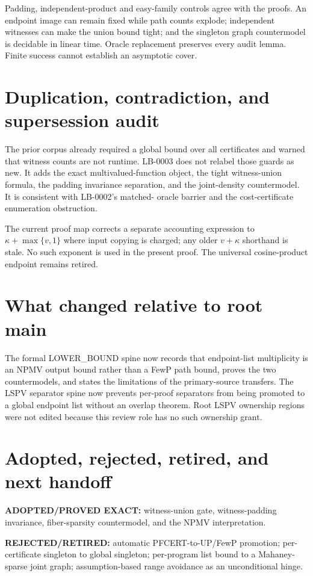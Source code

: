 \documentclass[11pt]{article}
\begin{document}
Padding, independent-product and easy-family controls agree with the
proofs.  An endpoint image can remain fixed while path counts explode;
independent witnesses can make the union bound tight; and the singleton
graph countermodel is decidable in linear time.  Oracle replacement
preserves every audit lemma.  Finite success cannot establish an
asymptotic cover.

\section{Duplication, contradiction, and supersession audit}
The prior corpus already required a global bound over all certificates
and warned that witness counts are not runtime.  LB-0003 does not relabel
those guards as new.  It adds the exact multivalued-function object, the
tight witness-union formula, the padding invariance separation, and the
joint-density countermodel.  It is consistent with LB-0002's matched-
oracle barrier and the cost-certificate enumeration obstruction.

The current proof map corrects a separate accounting expression to
$\kappa+\max\{v,1\}$ where input copying is charged; any older
$v+\kappa$ shorthand is stale.  No such exponent is used in the present
proof.  The universal cosine-product endpoint remains retired.

\section{What changed relative to root main}
The formal LOWER\_BOUND spine now records that endpoint-list multiplicity
is an NPMV output bound rather than a FewP path bound, proves the two
countermodels, and states the limitations of the primary-source
transfers.  The LSPV separator spine now prevents per-proof separators
from being promoted to a global endpoint list without an overlap theorem.
Root LSPV ownership regions were not edited because this review role has
no such ownership grant.

\section{Adopted, rejected, retired, and next handoff}
\textbf{ADOPTED/PROVED EXACT:} witness-union gate, witness-padding
invariance, fiber-sparsity countermodel, and the NPMV interpretation.

\textbf{REJECTED/RETIRED:} automatic PFCERT-to-UP/FewP promotion;
per-certificate singleton to global singleton; per-program list bound to
a Mahaney-sparse joint graph; assumption-based range avoidance as an
unconditional hinge.
\end{document}
